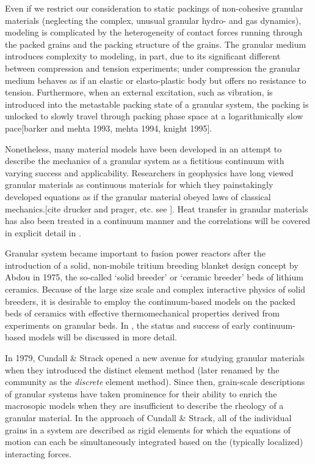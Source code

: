 Even if we restrict our consideration to static packings of non-cohesive granular materials (neglecting the complex, unusual granular hydro- and gas dynamics), modeling is complicated by the heterogeneity of contact forces running through the packed grains and the packing structure of the grains. The granular medium introduces complexity to modeling, in part, due to its significant different between compression and tension experiments; under compression the granular medium behaves as if an elastic or elasto-plastic body but offers no resistance to tension. Furthermore, when an external excitation, such as vibration, is introduced into the metastable packing state of a granular system, the packing is unlocked to slowly travel through packing phase space at a logarithmically slow pace[barker and mehta 1993, mehta 1994, knight 1995]. 

Nonetheless, many material models have been developed in an attempt to describe the mechanics of a granular system as a fictitious continuum with varying success and applicability. Researchers in geophysics have long viewed granular materials as continuous materials for which they painstakingly developed equations as if the granular material obeyed laws of classical mechanics.\cite{duran2012sands}[cite drucker and prager, etc. see \cite{Hill}]. Heat transfer in granular materials has also been treated in a continuum manner and the correlations will be covered in explicit detail in . 

Granular system became important to fusion power reactors after the introduction of a solid, non-mobile tritium breeding blanket design concept by Abdou\etal\cite{Abdou1975} in 1975, the so-called `solid breeder' or `ceramic breeder' beds of lithium ceramics. Because of the large size scale and complex interactive physics of solid breeders, it is desirable to employ the continuum-based models on the packed beds of ceramics with effective thermomechanical properties derived from experiments on granular beds. In , the status and success of early continuum-based models will be discussed in more detail.

In 1979, Cundall \& Strack opened a new avenue for studying granular materials when they introduced the distinct element method (later renamed by the community as the \textit{discrete} element method).\cite{Cundall1979} Since then, grain-scale descriptions of granular systems have taken prominence for their ability to enrich the macrosopic models when they are insufficient to describe the rheology of a granular material. In the approach of Cundall \& Strack, all of the individual grains in a system are described as rigid elements for which the equations of motion can each be simultaneously integrated based on the (typically localized) interacting forces.


